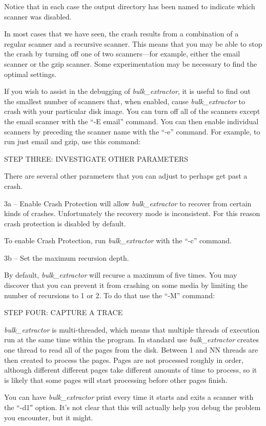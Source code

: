 \documentclass[10pt,twoside]{article}
\newcommand{\bulk}{\emph{bulk\_extractor}\xspace}
\begin{document}
Notice that in each case the output directory has been named to indicate which scanner was disabled.

In most cases that we have seen, the crash results from a combination of a regular scanner and a recursive scanner. This means that you may be able to stop the crash by turning off one of two scanners—for example, either the email scanner or the gzip scanner. Some experimentation may be necessary to find the optimal settings.

If you wish to assist in the debugging of \bulk, it is useful to find out the smallest number of scanners that, when enabled, cause \bulk to crash with your particular disk image. You can turn off all of the scanners except the email scanner with the “-E email” command. You can then enable individual scanners by preceding the scanner name with the “-e” command. For example, to run just email and gzip, use this command:


STEP THREE: INVESTIGATE OTHER PARAMETERS

There are several other parameters that you can adjust to perhaps get past a crash.

3a – Enable Crash Protection will allow \bulk to recover from certain kinds of crashes. Unfortunately the recovery mode is inconsistent. For this reason crash protection is disabled by default.

To enable Crash Protection, run \bulk with the “-c” command.

3b – Set the maximum recursion depth.

By default, \bulk will recurse a maximum of five times. You may discover that you can prevent it from crashing on some media by limiting the number of recursions to 1 or 2. To do that use the “-M” command:


STEP FOUR: CAPTURE A TRACE

\bulk is multi-threaded, which means that multiple threads of execution run at the same time within the program. In standard use \bulk creates one thread to read all of the pages from the disk. Between 1 and NN threads are then created to process the pages. Pages are not processed roughly in order, although different different pages take different amounts of time to process, so it is likely that some pages will start processing before other pages finish.

You can have \bulk print every time it starts and exits a scanner with the “-d1″ option. It’s not clear that this will actually help you debug the problem you encounter, but it might.
\end{document}
